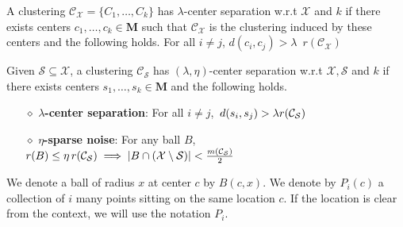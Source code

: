 \documentclass[orivec]{llncs}
\newcommand{\mc}{\mathcal}
\newcommand{\mb}{\mathbf}
\begin{document}
\begin{definition}
\label{defn:lambdacs}
A clustering $\mc C_{\mc X} = \{C_1, \ldots, C_k\}$ has $\lambda$-center separation w.r.t $\mc X$ and $k$ if there exists centers $c_1, \ldots, c_k \in \mb M$ such that $\mc C_{\mc X}$ is the clustering induced by these centers and the following holds. For all $i\neq j$, $d(c_i, c_j) > \lambda \enspace r(\mc{C}_{\mc{X}})$
\end{definition}

\begin{definition}
Given $\mc S \subseteq \mc X$, a clustering $\mc C_{\mc S}$ has $(\lambda, \eta)$-center separation w.r.t $\mc X, \mc S$ and $k$ if there exists centers $s_1, \ldots, s_k \in \mb M$ and the following holds.

\begin{itemize}[nolistsep, noitemsep]
\label{defn:lambdacsnoise}	

\item[$\diamond$] {\bf $\lambda$-center separation}: For all $i\neq j$, $\thinspace d(s_i, s_j) > \lambda r({\mc C}_{\mc S})$
\item[$\diamond$]{\bf $\eta$-sparse noise}: For any ball $B$, $r(B)\leq \eta \thinspace r(\mc{C}_{\mc S}) \implies |B\cap (\mc X\setminus \mc S)| < \frac{m(\mc C_{\mc S})}{2}$
\end{itemize}
\end{definition}

We denote a ball of radius $x$ at center $c$ by $B(c, x)$. We denote by $P_{i}(c)$ a collection of $i$ many points sitting on the same location $c$. If the location is clear from the context, we will use the notation $P_i$.

\end{document}
